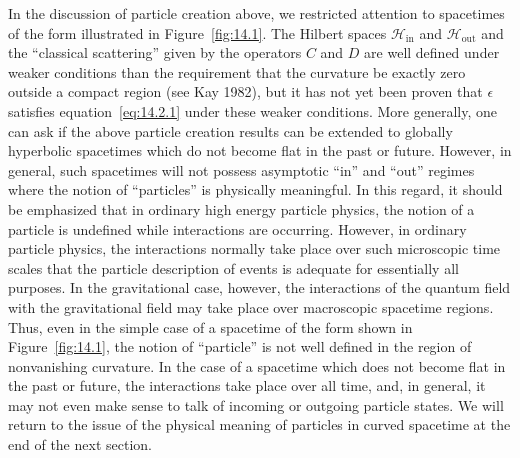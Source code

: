 In the discussion of particle creation above, we restricted attention to spacetimes of
the form illustrated in Figure~\ref{fig:14.1}. The Hilbert spaces
\(\mathcal H_{\mathrm{in}}\) and \(\mathcal H_{\mathrm{out}}\) and the ``classical
scattering'' given by the operators \(C\) and \(D\) are well defined under weaker
conditions than the requirement that the curvature be exactly zero outside a compact
region (see Kay 1982), but it has not yet been proven that \(\epsilon\) satisfies
equation~\eqref{eq:14.2.1} under these weaker conditions. More generally, one can
ask if the above particle creation results can be extended to globally hyperbolic
spacetimes which do not become flat in the past or future. However, in general, such
spacetimes will not possess asymptotic ``in'' and ``out'' regimes where the notion of
``particles'' is physically meaningful. In this regard, it should be emphasized that in
ordinary high energy particle physics, the notion of a particle is undefined while
interactions are occurring. However, in ordinary particle physics, the interactions
normally take place over such microscopic time scales that the particle description
of events is adequate for essentially all purposes. In the gravitational case, however,
the interactions of the quantum field with the gravitational field may take place over
macroscopic spacetime regions. Thus, even in the simple case of a spacetime of the
form shown in Figure~\ref{fig:14.1}, the notion of ``particle'' is not well defined in
the region of nonvanishing curvature. In the case of a spacetime which does not
become flat in the past or future, the interactions take place over all time, and, in
general, it may not even make sense to talk of incoming or outgoing particle states.
We will return to the issue of the physical meaning of particles in curved spacetime
at the end of the next section.

